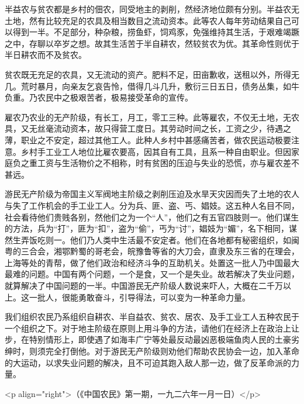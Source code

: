 半益农与贫农都是乡村的佃农，同受地主的剥削，然经济地位颇有分别。半益农无土地，然有比较充足的农具及相当数目之流动资本。此等农人每年劳动结果自己可以得到一半。不足部分，种杂粮，捞鱼虾，饲鸡豕，免强维持其生活，于艰难竭蹶之中，存聊以卒岁之想。故其生活苦于半自耕农，然较贫农为优。其革命性则优于半日耕农而不及贫农。

贫农既无充足的农具，又无流动的资产。肥料不足，田亩歉收，送租以外，所得无几。荒时暴月，向亲友乞哀告怜，借得几斗几升，敷衍三日五日，债务丛集，如牛负重。乃农民中之极艰苦者，极易接受革命的宣传。

雇农乃农业的无产阶级，有长工，月工，零工三种。此等雇农，不仅无土地，无农具，又无丝毫流动资本，故只得营工度日。其劳动时间之长，工资之少，待遇之薄，职业之不安定，超过其他工人。此种人乡村中甚感痛苦者，做农民运动极要注意。乡村手工业工人地位比雇农要高，因其自有工具，且系一种自由职业。但因家庭负之重工资与生活物价之不相称，时有贫困的压迫与失业的恐慌，亦与雇农差不甚远。

游民无产阶级为帝国主义军阀地主阶级之剥削压迫及水旱天灾因而失了土地的农人与失了工作机会的手工业工人。分为兵、匪、盗、丐、娼妓。这五种人名目不同，社会看待他们贵贱各别，然他们之为一个“人”，他们之有五官四肢则一。他们谋生的方法，兵为“打”，匪为“扣”，盗为“偷”，丐为“讨”，娼妓为“媚”，名下相同，谋然生弄饭吃则一。他们乃人类中生活最不安定者。他们在各地都有秘密组织，如闽粤的三合会，湘鄂黔蜀的哥老会，皖豫鲁等省的大刀会，直隶及东三省的在理会，上海等处的青帮，做了他们政治和经济斗争的互助机关。处置这一批人乃中国最大最难的问题。中国有两个问题，一个是食，又一个是失业。故若解决了失业问题，就算解决了中国问题的一半。中国游民无产阶级人数说来吓人，大概在二千万以上。这一批人，很能勇敢奋斗，引导得法，可以变为一种革命力量。

我们组织农民乃系组织自耕农、半自益农、贫农、居农、及手工业工人五种农民于一个组织之下。对于地主阶级在原则上用斗争的方法，请他们在经济上在政治上让步，在特别情形上，即使遇了如海丰广宁等处最反动最凶恶极端鱼肉人民的土豪劣绅时，则须完全打倒他。对于游民无产阶级则劝他们帮助农民协会一边，加入革命的大运动，以求失业问题的解决，且不可迫其跑入敌人那一边，做了反革命派的力量。

<p align="right">（《中国农民》第一期，一九二六年一月一日）</p>

